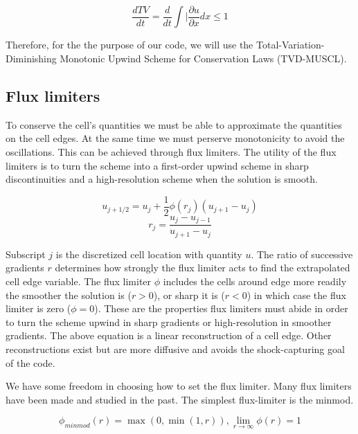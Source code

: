 \documentclass[12pt,upcase]{umlthesis}
\begin{document}
\begin{equation}\label{eq:tvd}
	\frac{dTV}{dt} = \frac{d}{dt} \int \lvert \frac{\partial u}{\partial x} dx \leq 1
\end{equation}

Therefore, for the the purpose of our code, we will use the Total-Variation-Diminishing Monotonic Upwind Scheme for Conservation Laws (TVD-MUSCL).

\subsection{Flux limiters}

To conserve the cell's quantities we must be able to approximate the quantities on the cell edges. At the same time we must perserve monotonicity to avoid the oscillations. This can be achieved through flux limiters. The utility of the flux limiters is to turn the scheme into a first-order upwind scheme in sharp discontinuities and a high-resolution scheme when the solution is smooth.

\begin{equation}\label{eq:fluxlimiter}
	u_{j+1/2} = u_j + \frac{1}{2} \phi(r_j) (u_{j+1} - u_j)
\end{equation}
\begin{equation}
	r_j = \frac{u_j - u_{j-1}}{u_{j+1} - u_j}
\end{equation}

Subscript $j$ is the discretized cell location with quantity $u$. The ratio of successive gradients $r$ determines how strongly the flux limiter acts to find the extrapolated cell edge variable. The flux limiter $\phi$ includes the cells around edge more readily the smoother the solution is ($r>0$), or sharp it is ($r<0$) in which case the flux limiter is zero ($\phi=0$). These are the properties flux limiters must abide in order to turn the scheme upwind in sharp gradients or high-resolution in smoother gradients. The above equation is a linear reconstruction of a cell edge. Other reconstructions exist but are more diffusive and avoids the shock-capturing goal of the code.

We have some freedom in choosing how to set the flux limiter. Many flux limiters have been made and studied in the past. The simplest flux-limiter is the minmod.

\begin{equation}\label{eq:minmod}
	\phi_{minmod}(r) = \max(0, \min(1, r)), \lim_{r \to \infty} \phi(r) = 1
\end{equation}
\end{document}
